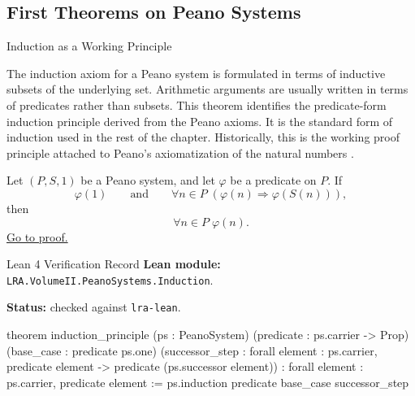 \subsection{First Theorems on Peano Systems}

\begin{topicbox}{Induction as a Working Principle}
\begin{exposition}
The induction axiom for a Peano system is formulated in terms of inductive
subsets of the underlying set. Arithmetic arguments are usually written in
terms of predicates rather than subsets. This theorem identifies the
predicate-form induction principle derived from the Peano axioms. It is the
standard form of induction used in the rest of the chapter. Historically,
this is the working proof principle attached to Peano's axiomatization of the
natural numbers \citep{PeanoArithmeticesPrincipia1889}.
\end{exposition}

\begin{tcolorbox}[colback=thmbox, colframe=thmborder, arc=2pt,
  left=6pt, right=6pt, top=4pt, bottom=4pt,
  title={\small\textbf{Theorem (Induction Principle for a Peano System)}},
  fonttitle=\small\bfseries]
\begin{theorem}
\label{thm:induction-principle-for-peano-system}
Let $(P,S,1)$ be a Peano system, and let $\varphi$ be a predicate on $P$.
If
\[
\varphi(1)
\qquad\text{and}\qquad
\forall n \in P\;(\varphi(n) \Longrightarrow \varphi(S(n))),
\]
then
\[
\forall n \in P\;\varphi(n).
\]
\hyperref[prf:induction-principle-for-peano-system]{Go to proof.}
\end{theorem}
\end{tcolorbox}

\begin{formalizationrecord}{Lean 4 Verification Record}
\textbf{Lean module:} \texttt{LRA.VolumeII.PeanoSystems.Induction}.\par
{}
\textbf{Status:} checked against \texttt{lra-lean}.\par

\begin{leancode}
theorem induction_principle
    (ps : PeanoSystem)
    (predicate : ps.carrier -> Prop)
    (base_case : predicate ps.one)
    (successor_step :
      forall element : ps.carrier,
        predicate element ->
        predicate (ps.successor element)) :
    forall element : ps.carrier,
      predicate element :=
  ps.induction predicate base_case successor_step
\end{leancode}
\end{formalizationrecord}


\end{topicbox}

